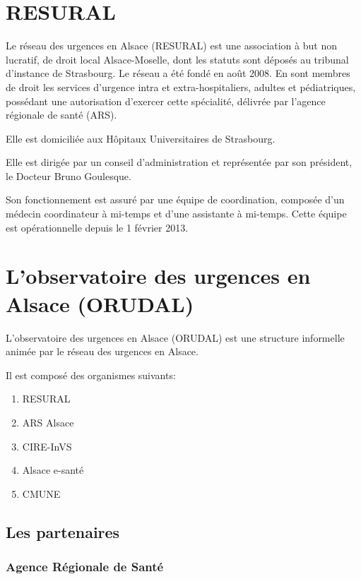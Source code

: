 \documentclass[12pt,english,french,twoside]{book}\usepackage[]{graphicx}\usepackage[]{color}
\begin{document}
\newpage
\chapter{RESURAL}


Le réseau des urgences en Alsace (RESURAL) est une association à but non lucratif, de droit local Alsace-Moselle, dont les statuts sont déposés au tribunal d'instance de Strasbourg. Le réseau a été fondé en août 2008. En sont membres de droit les services d'urgence intra et extra-hospitaliers, adultes et pédiatriques, possédant une autorisation d'exercer cette spécialité, délivrée par l'agence régionale de santé (ARS). 

Elle est domiciliée aux Hôpitaux Universitaires de Strasbourg.

Elle est dirigée par un conseil d'administration et représentée par son président, le Docteur Bruno Goulesque.

Son fonctionnement est assuré par une équipe de coordination, composée d'un médecin coordinateur à mi-temps et d'une assistante à mi-temps. Cette équipe est opérationnelle depuis le 1\ier{} février 2013.

\newpage
\chapter{L'observatoire des urgences en Alsace (ORUDAL)}


L'observatoire des urgences en Alsace (ORUDAL) est une structure informelle animée par le réseau des urgences en Alsace.

Il est composé des organismes suivants:
\begin{enumerate}
  \item RESURAL 
  \item ARS Alsace
  \item CIRE-InVS
  \item Alsace e-santé
  \item CMUNE
\end{enumerate}


\section*{Les partenaires}

  \subsection*{Agence Régionale de Santé}
    
\end{document}
